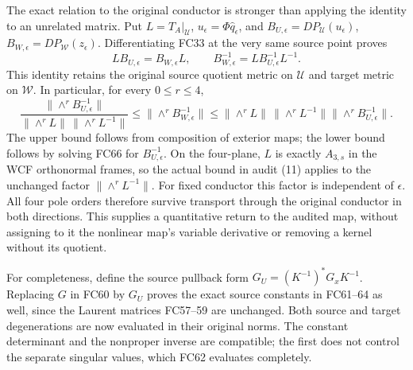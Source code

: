 The exact relation to the original conductor is stronger than applying
the identity to an unrelated matrix. Put $L=T_A|_{\mathcal U}$,
$u_\epsilon=\Phi\widehat q_\epsilon$, and
$B_{U,\epsilon}=DP_{\mathcal U}(u_\epsilon)$,
$B_{W,\epsilon}=DP_{\mathcal W}(z_\epsilon)$. Differentiating FC33
at the very same source point proves
\[
 LB_{U,\epsilon}=B_{W,\epsilon}L,\qquad
 B_{W,\epsilon}^{-1}=L B_{U,\epsilon}^{-1}L^{-1}.
 \tag{FC66}
\]
This identity retains the original source quotient metric on $\mathcal U$
and target metric on $\mathcal W$. In particular, for every $0\le r\le4$,
\[
 \frac{\|\wedge^r B_{U,\epsilon}^{-1}\|}
 {\|\wedge^r L\|\,\|\wedge^r L^{-1}\|}
 \le\|\wedge^r B_{W,\epsilon}^{-1}\|
 \le\|\wedge^r L\|\,\|\wedge^r L^{-1}\|
       \|\wedge^r B_{U,\epsilon}^{-1}\|.
 \tag{FC67}
\]
The upper bound follows from composition of exterior maps; the lower
bound follows by solving FC66 for $B_{U,\epsilon}^{-1}$. On the four-plane,
$L$ is exactly $A_{3,s}$ in the WCF orthonormal frames, so the actual
bound in audit (11) applies to the unchanged factor
$\|\wedge^rL^{-1}\|$. For fixed conductor this factor is independent
of $\epsilon$. All four pole orders therefore survive transport through
the original conductor in both directions. This supplies a quantitative
return to the audited map, without assigning to it the nonlinear map's
variable derivative or removing a kernel without its quotient.

For completeness, define the source pullback form
$G_U=(K^{-1})^*G_xK^{-1}$. Replacing $G$ in FC60 by $G_U$ proves
the exact source constants in FC61--64 as well, since the Laurent
matrices FC57--59 are unchanged. Both source and target degenerations
are now evaluated in their original norms. The constant determinant
and the nonproper inverse are compatible; the first does not control
the separate singular values, which FC62 evaluates completely.

